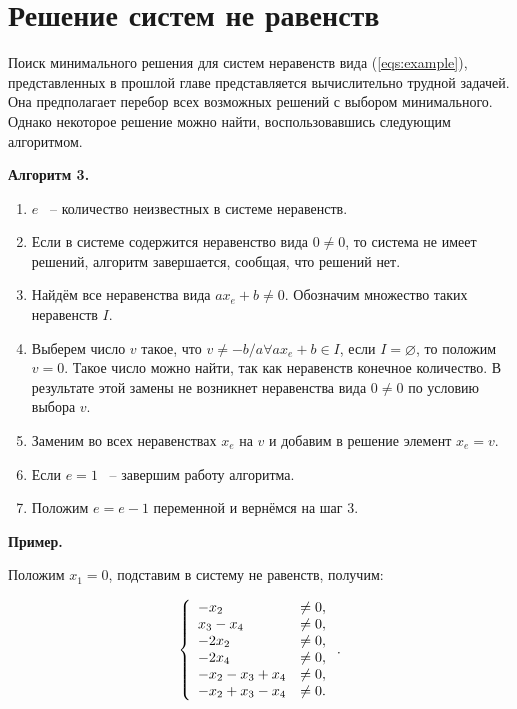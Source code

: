 \documentclass[14pt]{mmcs-article}
\begin{document}
\section{Решение систем не равенств}

Поиск минимального решения для систем неравенств вида (\ref{eqs:example}), представленных в прошлой главе представляется вычислительно трудной задачей. Она предполагает перебор всех возможных решений с выбором минимального. Однако некоторое решение можно найти, воспользовавшись следующим алгоритмом.

\textbf{Алгоритм 3.}

\begin{enumerate}
    \item $e$ ~-- количество неизвестных в системе неравенств.
    \item Если в системе содержится неравенство вида $0 \neq 0$, то система не имеет решений, алгоритм завершается, сообщая, что решений нет.
    \item Найдём все неравенства вида $a x_e + b \neq 0$. Обозначим множество таких неравенств $I$.
    \item Выберем число $v$ такое, что $v \neq -b/a \forall a x_e + b \in I$, если $I = \varnothing$, то положим $v = 0$. Такое число можно найти, так как неравенств конечное количество. В результате этой замены не возникнет неравенства вида $0 \neq 0$ по условию выбора $v$.
    \item Заменим во всех неравенствах $x_e$ на $v$ и добавим в решение элемент $x_e = v$.
    \item Если $e = 1$ ~-- завершим работу алгоритма.
    \item Положим $e = e - 1$ переменной и вернёмся на шаг 3.
\end{enumerate}

\textbf{Пример.}

Положим $x_1 = 0$, подставим в систему не равенств, получим:

\begin{equation}
    \centering
    \left\{
        \begin{array}{ll}
            - x_2 &\neq 0            ,\\
            x_3 - x_4 &\neq 0        ,\\
            - 2 x_2 &\neq 0          ,\\
            - 2 x_4 &\neq 0          ,\\
            - x_2 - x_3 + x_4 &\neq 0,\\
            - x_2 + x_3 - x_4 &\neq 0.\\
        \end{array}
    \right..
    \label{eqs:cycle_search_neqs}
\end{equation}
\end{document}

